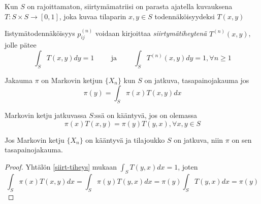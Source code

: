 \begin{maar}
	Kun $S$ on rajoittamaton, siirtymämatriisi on parasta ajatella kuvauksena $T: S\times S \rightarrow [0,1]$, joka kuvaa tilaparin $x,y\in S$ todennäköisyydeksi $T(x,y)$
\end{maar}

\begin{maar}
	Iistymätodennäköisyys $p^{(n)}_{ij}$ voidaan kirjoittaa \textit{siirtymätiheytenä} $T^{(n)}(x,y)$, jolle pätee
	\begin{equation}\label{siirt-tiheys}
		\int_S T(x,y)dy = 1 \hspace{1cm} \text{ja} \hspace{1cm} \int_S T^{(n)}(x,y)dy = 1, \forall n \geq 1
	\end{equation}
\end{maar}

\begin{maar}
	Jakauma $\pi$ on Markovin ketjun $\{ X_n \}$ kun $S$ on jatkuva, tasapainojakauma jos 
	\begin{equation}
		\pi(y) = \int_S \pi(x) T(x,y) dx
	\end{equation}
\end{maar}

\begin{maar}\label{kaant-jatk}
	Markovin ketju jatkuvassa $S$:ssä on kääntyvä, jos on olemassa 
	\begin{equation}
		\pi(x)T(x,y)=\pi(y)T(y,x), \forall x,y\in S
	\end{equation}
\end{maar}

\begin{lause}
	Jos Markovin ketju $\{X_n\}$ on kääntyvä ja tilajoukko $S$ on jatkuva, niin $\pi$ on sen tasapainojakauma.
\end{lause}

\begin{proof}
	Yhtälön \ref{siirt-tiheys} mukaan $\int_S T(y,x)dx = 1$, joten
	\begin{equation}
		\int_S \pi(x) T(x,y) dx = \int_S \pi(y) T(y,x) dx = \pi(y)\int_S T(y,x) dx = \pi(y)
	\end{equation}
\end{proof}
























































